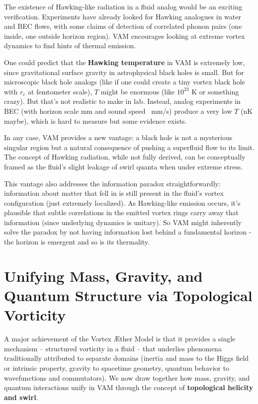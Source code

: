 \documentclass[a4paper,12pt]{article}
\begin{document}
    The existence of Hawking-like radiation in a fluid analog would be an exciting verification. Experiments have already looked for Hawking analogues in water and BEC flows, with some claims of detection of correlated phonon pairs (one inside, one outside horizon region). VAM encourages looking at extreme vortex dynamics to find hints of thermal emission.

    One could predict that the \textbf{Hawking temperature} in VAM is extremely low, since gravitational surface gravity in astrophysical black holes is small. But for microscopic black hole analogs (like if one could create a tiny vortex black hole with $r_c$ at femtometer scale), $T$ might be enormous (like $10^{23}$ K or something crazy). But that’s not realistic to make in lab. Instead, analog experiments in BEC (with horizon scale mm and sound speed ~mm/s) produce a very low $T$ (nK maybe), which is hard to measure but some evidence exists.

    In any case, VAM provides a new vantage: a black hole is not a mysterious singular region but a natural consequence of pushing a superfluid flow to its limit. The concept of Hawking radiation, while not fully derived, can be conceptually framed as the fluid’s slight leakage of swirl quanta when under extreme stress.

    This vantage also addresses the information paradox straightforwardly: information about matter that fell in is still present in the fluid’s vortex configuration (just extremely localized). As Hawking-like emission occurs, it’s plausible that subtle correlations in the emitted vortex rings carry away that information (since underlying dynamics is unitary). So VAM might inherently solve the paradox by not having information lost behind a fundamental horizon - the horizon is emergent and so is its thermality.

\section{Unifying Mass, Gravity, and Quantum Structure via Topological Vorticity}
    A major achievement of the Vortex Æther Model is that it provides a single mechanism -- structured vorticity in a fluid -- that underlies phenomena traditionally attributed to separate domains (inertia and mass to the Higgs field or intrinsic property, gravity to spacetime geometry, quantum behavior to wavefunctions and commutators). We now draw together how mass, gravity, and quantum interactions unify in VAM through the concept of \textbf{topological helicity and swirl}.
\end{document}
